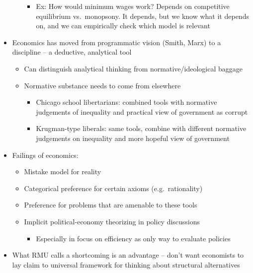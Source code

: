 \begin{itemize}
\begin{itemize}
    \begin{itemize}
    \tightlist
    \item
      Ex: How would minimum wages work? Depends on competitive
      equilibrium vs.~monopsony. It depends, but we know what it depends
      on, and we can empirically check which model is relevant
    \end{itemize}
  \end{itemize}
\item
  Economics has moved from programmatic vision (Smith, Marx) to a
  discipline -- a deductive, analytical tool

  \begin{itemize}
  \tightlist
  \item
    Can distinguish analytical thinking from normative/ideological
    baggage
  \item
    Normative substance needs to come from elsewhere

    \begin{itemize}
    \tightlist
    \item
      Chicago school libertarians: combined tools with normative
      judgements of inequality and practical view of government as
      corrupt
    \item
      Krugman-type liberals: same tools, combine with different
      normative judgements on inequality and more hopeful view of
      government
    \end{itemize}
  \end{itemize}
\item
  Failings of economics:

  \begin{itemize}
  \tightlist
  \item
    Mistake model for reality
  \item
    Categorical preference for certain axioms (e.g.~rationality)
  \item
    Preference for problems that are amenable to these tools
  \item
    Implicit political-economy theorizing in policy discussions

    \begin{itemize}
    \tightlist
    \item
      Especially in focus on efficiency as only way to evaluate policies
    \end{itemize}
  \end{itemize}
\item
  What RMU calls a shortcoming is an advantage -- don't want economists
  to lay claim to universal framework for thinking about structural
  alternatives
\end{itemize}

